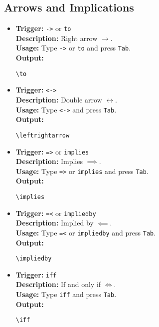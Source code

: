 \documentclass{article}
\begin{document}
\subsection{Arrows and Implications}
\begin{itemize}[leftmargin=*, label={}]
\item \textbf{Trigger:} \texttt{->} or \texttt{to} \\
\textbf{Description:} Right arrow \(\to\). \\
\textbf{Usage:} Type \texttt{->} or \texttt{to} and press \texttt{Tab}. \\
\textbf{Output:}
\begin{verbatim}
\to 
\end{verbatim}

\item \textbf{Trigger:} \texttt{<->} \\
\textbf{Description:} Double arrow \(\leftrightarrow\). \\
\textbf{Usage:} Type \texttt{<->} and press \texttt{Tab}. \\
\textbf{Output:}
\begin{verbatim}
\leftrightarrow 
\end{verbatim}

\item \textbf{Trigger:} \texttt{=>} or \texttt{implies} \\
\textbf{Description:} Implies \(\implies\). \\
\textbf{Usage:} Type \texttt{=>} or \texttt{implies} and press \texttt{Tab}. \\
\textbf{Output:}
\begin{verbatim}
\implies 
\end{verbatim}

\item \textbf{Trigger:} \texttt{=<} or \texttt{impliedby} \\
\textbf{Description:} Implied by \(\impliedby\). \\
\textbf{Usage:} Type \texttt{=<} or \texttt{impliedby} and press \texttt{Tab}. \\
\textbf{Output:}
\begin{verbatim}
\impliedby 
\end{verbatim}

\item \textbf{Trigger:} \texttt{iff} \\
\textbf{Description:} If and only if \(\iff\). \\
\textbf{Usage:} Type \texttt{iff} and press \texttt{Tab}. \\
\textbf{Output:}
\begin{verbatim}
\iff 
\end{verbatim}


\end{itemize}
\end{document}
